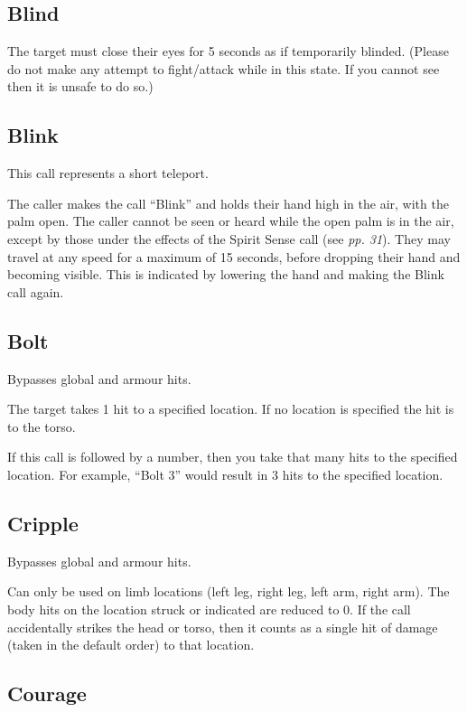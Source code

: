 \documentclass{scrbook}
\begin{document}
\subsection{Blind}

The target must close their eyes for 5 seconds as if temporarily blinded. (Please do not make any attempt to fight/attack while in this state. If you cannot see then it is unsafe to do so.)

\subsection{Blink}

This call represents a short teleport.

The caller makes the call ``Blink'' and holds their hand high in the air, with the palm open. The caller cannot be seen or heard while the open palm is in the air, except by those under the effects of the Spirit Sense call (see \textit{pp. 31}). They may travel at any speed for a maximum of 15 seconds, before dropping their hand and becoming visible. This is indicated by lowering the hand and making the Blink call again.

\subsection{Bolt}

Bypasses global and armour hits.

The target takes 1 hit to a specified location. If no location is specified the hit is to the torso.

If this call is followed by a number, then you take that many hits to the specified location. For example, ``Bolt 3'' would result in 3 hits to the specified location.

\subsection{Cripple}

Bypasses global and armour hits.

Can only be used on limb locations (left leg, right leg, left arm, right arm). The body hits on the location struck or indicated are reduced to 0. If the call accidentally strikes the head or torso, then it counts as a single hit of damage (taken in the default order) to that location.

\subsection{Courage}
\end{document}
